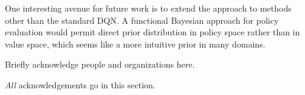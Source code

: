 \documentclass[]{uai2022} %
\begin{document}
One interesting avenue for future work is to extend the approach to methods other than
the standard DQN. A functional Bayesian approach for policy evaluation would permit direct
prior distribution in policy space rather than in value space, which seems like a
more intuitive prior in many domains.


\begin{acknowledgements} %
    Briefly acknowledge people and organizations here.

    \emph{All} acknowledgements go in this section.
\end{acknowledgements}



\appendix
\end{document}
